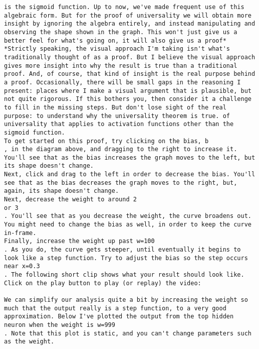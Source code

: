 \begin{lstlisting}
is the sigmoid function. Up to now, we've made frequent use of this algebraic form. But for the proof of universality we will obtain more insight by ignoring the algebra entirely, and instead manipulating and observing the shape shown in the graph. This won't just give us a better feel for what's going on, it will also give us a proof* *Strictly speaking, the visual approach I'm taking isn't what's traditionally thought of as a proof. But I believe the visual approach gives more insight into why the result is true than a traditional proof. And, of course, that kind of insight is the real purpose behind a proof. Occasionally, there will be small gaps in the reasoning I present: places where I make a visual argument that is plausible, but not quite rigorous. If this bothers you, then consider it a challenge to fill in the missing steps. But don't lose sight of the real purpose: to understand why the universality theorem is true. of universality that applies to activation functions other than the sigmoid function.
To get started on this proof, try clicking on the bias, b
, in the diagram above, and dragging to the right to increase it. You'll see that as the bias increases the graph moves to the left, but its shape doesn't change.
Next, click and drag to the left in order to decrease the bias. You'll see that as the bias decreases the graph moves to the right, but, again, its shape doesn't change.
Next, decrease the weight to around 2
or 3
. You'll see that as you decrease the weight, the curve broadens out. You might need to change the bias as well, in order to keep the curve in-frame.
Finally, increase the weight up past w=100
. As you do, the curve gets steeper, until eventually it begins to look like a step function. Try to adjust the bias so the step occurs near x=0.3
. The following short clip shows what your result should look like. Click on the play button to play (or replay) the video:

We can simplify our analysis quite a bit by increasing the weight so much that the output really is a step function, to a very good approximation. Below I've plotted the output from the top hidden neuron when the weight is w=999
. Note that this plot is static, and you can't change parameters such as the weight.


\end{lstlisting}
